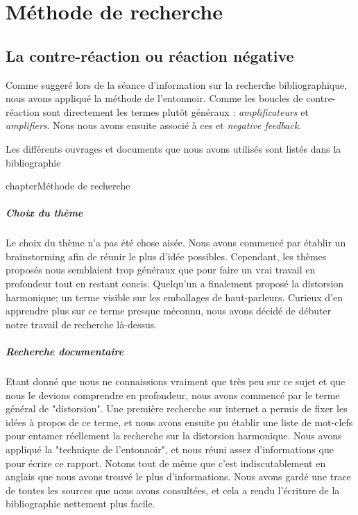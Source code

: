 

\chapter{Méthode de recherche}

\section{La contre-réaction ou réaction négative}
Comme suggeré lors de la séance d'information sur la recherche bibliographique,
nous avons appliqué la méthode de l'entonnoir. Comme les boucles de contre-réaction 
sont directement %
les termes plutôt généraux : \textit{amplificateurs} et \textit{amplifiers}. Nous 
nous avons ensuite associé à ces %
et \textit{negative feedback}.

Les différents ouvrages et documents que nous avons utilisés sont listés dans la bibliographie

chapter{Méthode de recherche}

\paragraph{Choix du thème}
Le choix du thème n'a pas été chose aisée. Nous avons commencé par établir un brainstorming afin de réunir 
le plus d'idée possibles. Cependant, les thèmes proposés nous semblaient trop généraux que pour faire un vrai 
travail en profondeur tout en restant concis. Quelqu'un a finalement proposé la distorsion harmonique; un 
terme visible sur les emballages de haut-parleurs. Curieux d'en apprendre plus sur ce terme presque méconnu, 
nous avons décidé de débuter notre travail de recherche là-dessus.

\paragraph{Recherche documentaire}
Etant donné que nous ne connaissions vraiment que très peu sur ce sujet et que nous 
le devions comprendre en profondeur, nous avons commencé par le terme général de "distorsion".
Une première recherche sur internet a permis de fixer les idées à propos de ce terme, et nous 
avons ensuite pu établir une liste de mot-clefs pour entamer réellement la recherche sur la 
distorsion harmonique. Nous avons appliqué la "technique de l'entonnoir", et nous %
réuni assez d'informations que pour écrire ce rapport. Notons tout de même que c'est indiscutablement
en anglais que nous avons 
trouvé le plus d'informations. Nous avons gardé une trace de toutes les sources que nous avons 
consultées, et cela a rendu l'écriture de la bibliographie nettement plus facile.

